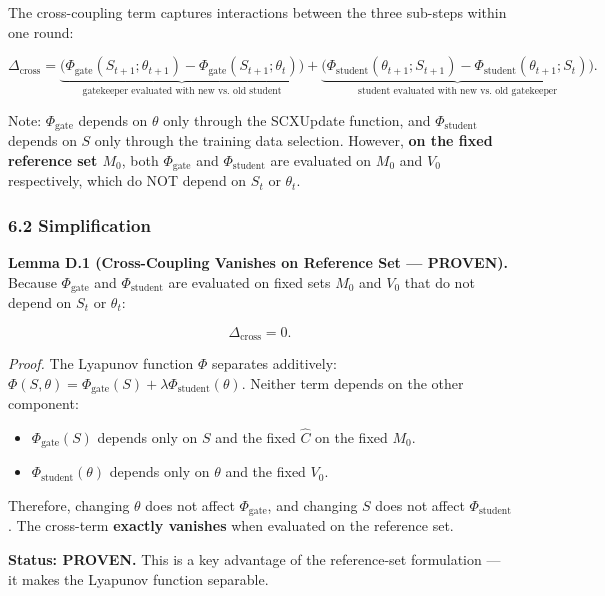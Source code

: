 \documentclass[
  12pt,
]{article}
\providecommand{\tightlist}{%
  \setlength{\itemsep}{0pt}\setlength{\parskip}{0pt}}
\begin{document}
The cross-coupling term captures interactions between the three
sub-steps within one round:

\[\Delta_{\text{cross}} = \underbrace{\bigl(\Phi_{\text{gate}}(S_{t+1}; \theta_{t+1}) - \Phi_{\text{gate}}(S_{t+1}; \theta_t)\bigr)}_{\text{gatekeeper evaluated with new vs. old student}} + \underbrace{\bigl(\Phi_{\text{student}}(\theta_{t+1}; S_{t+1}) - \Phi_{\text{student}}(\theta_{t+1}; S_t)\bigr)}_{\text{student evaluated with new vs. old gatekeeper}}.\]

Note: \(\Phi_{\text{gate}}\) depends on \(\theta\) only through the
SCXUpdate function, and \(\Phi_{\text{student}}\) depends on \(S\) only
through the training data selection. However, \textbf{on the fixed
reference set \(M_0\)}, both \(\Phi_{\text{gate}}\) and
\(\Phi_{\text{student}}\) are evaluated on \(M_0\) and \(V_0\)
respectively, which do NOT depend on \(S_t\) or \(\theta_t\).

\subsubsection{6.2 Simplification}\label{simplification}

\textbf{Lemma D.1 (Cross-Coupling Vanishes on Reference Set ---
PROVEN).} Because \(\Phi_{\text{gate}}\) and \(\Phi_{\text{student}}\)
are evaluated on fixed sets \(M_0\) and \(V_0\) that do not depend on
\(S_t\) or \(\theta_t\):

\[\Delta_{\text{cross}} = 0.\]

\emph{Proof.} The Lyapunov function \(\Phi\) separates additively:
\(\Phi(S, \theta) = \Phi_{\text{gate}}(S) + \lambda \Phi_{\text{student}}(\theta)\).
Neither term depends on the other component:

\begin{itemize}
\tightlist
\item
  \(\Phi_{\text{gate}}(S)\) depends only on \(S\) and the fixed
  \(\hat{C}\) on the fixed \(M_0\).
\item
  \(\Phi_{\text{student}}(\theta)\) depends only on \(\theta\) and the
  fixed \(V_0\).
\end{itemize}

Therefore, changing \(\theta\) does not affect \(\Phi_{\text{gate}}\),
and changing \(S\) does not affect \(\Phi_{\text{student}}\). The
cross-term \textbf{exactly vanishes} when evaluated on the reference
set.

\textbf{Status: PROVEN.} This is a key advantage of the reference-set
formulation --- it makes the Lyapunov function separable.
\end{document}
